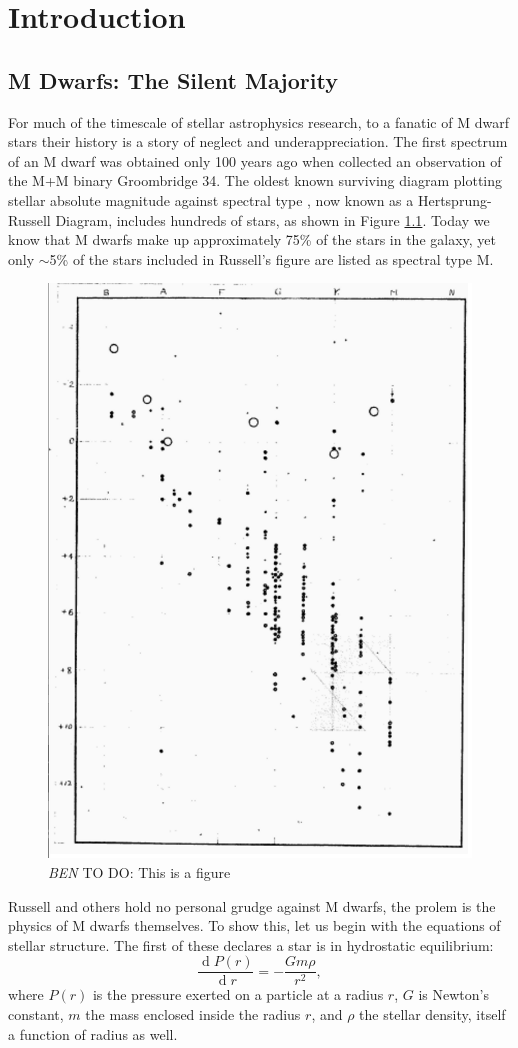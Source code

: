 \documentclass[12pt]{caltech_thesis}
\newcommand{\todo}[3]{{\color{#2} \emph{#1} TO DO: #3}}
\newcommand{\btmtodo}[1]{\todo{BEN}{red}{#1}}
\renewcommand{\d}[1]{\ensuremath{\operatorname{d}\!{#1}}}
\begin{document}
\tableofcontents
\listoffigures
\listoftables

\mainmatter

\chapter{Introduction}

\section{M Dwarfs: The Silent Majority}
For much of the timescale of stellar astrophysics research, to a fanatic 
of M dwarf stars their history is a story of neglect and underappreciation.
The first spectrum of an M dwarf was obtained only 100 years ago when 
\citet{Adams13} collected an observation of the M+M binary Groombridge 34.
The oldest known surviving diagram plotting stellar absolute magnitude against spectral type \citep{Russell14}, now known as a Hertsprung-Russell Diagram, includes hundreds of stars, as shown in Figure \ref{fig:HR}.
Today we know that M dwarfs make up approximately 75\% of the stars in the galaxy,
yet only $\sim$5\% of the stars included in Russell's figure are listed as
spectral type M.



\begin{figure}[hbt!]
\centering
\includegraphics[width=.5\textwidth]{hr.png}
\caption[Russell's original H-R Diagram]{\btmtodo{This is a figure}}
\label{fig:HR}
\end{figure}

Russell and others hold no personal grudge against M dwarfs, the prolem is the physics
of M dwarfs themselves.
To show this, let us begin with the equations of stellar structure.
The first of these declares a star is in hydrostatic equilibrium:
\begin{equation}
\frac{\d P(r)}{\d r} = - \frac{ G m \rho}{r^2 },
\label{eq:hydro}
\end{equation}
where $P(r)$ is the pressure exerted on a particle at a radius $r$, $G$ is Newton's
constant, $m$ the mass enclosed inside the radius $r$, and $\rho$ the stellar density,
itself a function of radius as well.
\end{document}
